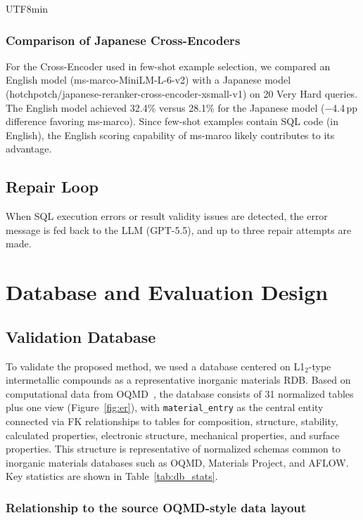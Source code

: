 \documentclass[sn-mathphys,Numbered]{sn-jnl}
\begin{document}
\begin{CJK}{UTF8}{min}
\subsubsection{Comparison of Japanese Cross-Encoders}

For the Cross-Encoder used in few-shot example selection, we compared
an English model (ms-marco-MiniLM-L-6-v2) with a Japanese model
(hotchpotch/japanese-reranker-cross-encoder-xsmall-v1) on 20 Very Hard
queries.
The English model achieved 32.4\% versus 28.1\% for the Japanese model
($-$4.4\,pp difference favoring ms-marco).
Since few-shot examples contain SQL code (in English), the English
scoring capability of ms-marco likely contributes to its advantage.

\subsection{Repair Loop}
\label{sec:repair}

When SQL execution errors or result validity issues are detected,
the error message is fed back to the LLM (GPT-5.5), and up to
three repair attempts are made.

\section{Database and Evaluation Design}
\label{sec:evaluation}

\subsection{Validation Database}

To validate the proposed method, we used a database centered on
L1$_2$-type intermetallic compounds as a representative inorganic
materials RDB.
Based on computational data from
OQMD~\cite{saal2013oqmd,kirklin2015oqmd}, the database consists of
31 normalized tables plus one view (Figure~\ref{fig:er}), with
\texttt{material\_entry} as the central entity connected via FK
relationships to tables for composition, structure, stability,
calculated properties, electronic structure, mechanical properties,
and surface properties.
This structure is representative of normalized schemas common to
inorganic materials databases such as OQMD, Materials Project, and
AFLOW.
Key statistics are shown in Table~\ref{tab:db_stats}.

\subsubsection{Relationship to the source OQMD-style data layout}


\end{CJK}
\end{document}
